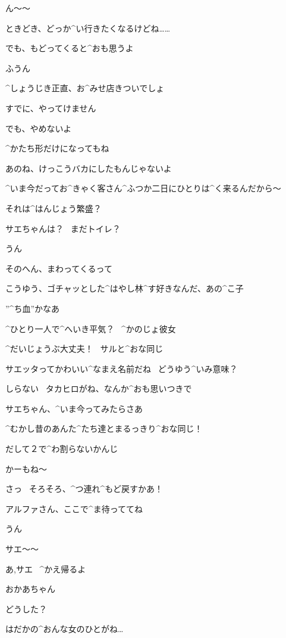 \Alpha ん〜〜

\Alpha ときどき、どっか^{い}{行}きたくなるけどね……

\Alpha でも、もどってくると^{おも}{思}うよ

\Makki ふうん

\page[111]
\Makki ^{しょうじき}{正直}、お^{みせ}{店}きついでしょ

\Alpha すでに、やってけません

\Alpha でも、やめないよ

\Alpha ^{かたち}{形}だけになってもね

\Alpha あのね、けっこうバカにしたもんじゃないよ

\Alpha ^{いま}{今}だってお^{きゃく}{客}さん^{ふつか}{二日}にひとりは^{く}{来}るんだから〜

\Makki それは^{はんじょう}{繁盛}？

\page[112]
\Alpha サエちゃんは？
\ まだトイレ？

\Makki うん

\Makki そのへん、まわってくるって

\Makki こうゆう、ゴチャッとした^{はやし}{林}^{す}{好}きなんだ、あの^{こ}{子}

\page[113]
\Makki ”^{ち}{血}”かなあ

\Alpha ^{ひとり}{一人}で^{へいき}{平気}？
\ ^{かのじょ}{彼女}

\Makki ^{だいじょうぶ}{大丈夫}！
\ サルと^{おな}{同}じ

\Alpha サエッタってかわいい^{なまえ}{名前}だね
\ どうゆう^{いみ}{意味}？

\Makki しらない
\ タカヒロがね、なんか^{おも}{思}いつきで

\page[114]
\Alpha サエちゃん、^{いま}{今}ってみたらさあ

\Alpha ^{むかし}{昔}のあんた^{たち}{達}とまるっきり^{おな}{同}じ！

\Alpha だして２で^{わ}{割}らないかんじ

\Makki かーもね〜

\page[115]
\Makki さっ
\ そろそろ、^{つ}{連}れ^{もど}{戻}すかあ！

\Makki アルファさん、ここで^{ま}{待}っててね

\Alpha うん

\page[117]
\Makki サエ〜〜

\page[118]
\Makki あ,サエ
\ ^{かえ}{帰}るよ

\Sae おかあちゃん

\Makki どうした？

\Sae はだかの^{おんな}{女}のひとがね…

